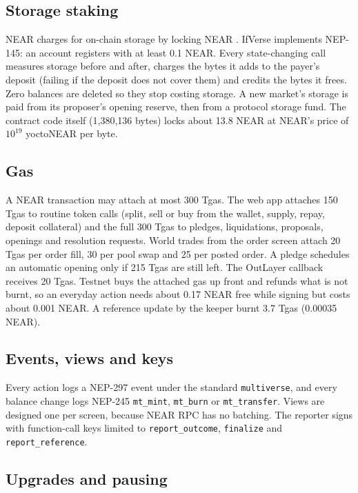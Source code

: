 \documentclass[11pt,a4paper]{article}
\newcommand{\code}[1]{\texttt{\small #1}}
\begin{document}
\subsection{Storage staking}

NEAR charges for on-chain storage by locking NEAR \cite{nep145}. IfVerse implements NEP-145: an account registers with
at least 0.1 NEAR. Every state-changing call measures storage before and after, charges the bytes it adds to the
payer's deposit (failing if the deposit does not cover them) and credits the bytes it frees. Zero balances are deleted
so they stop costing storage. A new market's storage is paid from its proposer's opening reserve, then from a
protocol storage fund. The contract code itself (1,380,136 bytes) locks about 13.8 NEAR at NEAR's price of
$10^{19}$ yoctoNEAR per byte.

\subsection{Gas}

A NEAR transaction may attach at most 300 Tgas. The web app attaches 150 Tgas to routine token calls (split, sell or
buy from the wallet, supply, repay, deposit collateral) and the full 300 Tgas to pledges, liquidations, proposals,
openings and resolution requests. World trades from the order screen attach 20 Tgas per order fill, 30 per pool swap
and 25 per posted order. A pledge schedules an automatic opening only if 215 Tgas are still left. The OutLayer
callback receives 20 Tgas. Testnet buys the attached gas up front and refunds what is not burnt, so an everyday
action needs about 0.17 NEAR free while signing but costs about 0.001 NEAR. A reference update by the keeper burnt
3.7 Tgas (0.00035 NEAR).

\subsection{Events, views and keys}

Every action logs a NEP-297 event \cite{nep297} under the standard \code{multiverse}, and every balance change logs
NEP-245 \code{mt\_mint}, \code{mt\_burn} or \code{mt\_transfer}. Views are designed one per screen, because NEAR RPC has
no batching. The reporter signs with function-call keys limited to \code{report\_outcome}, \code{finalize} and
\code{report\_reference}.

\subsection{Upgrades and pausing}
\end{document}
